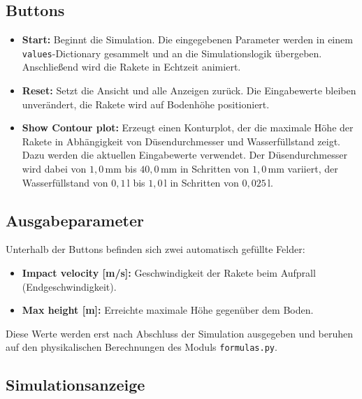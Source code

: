 \documentclass{SimSemBericht} %
\begin{document}
\subsection{Buttons}

\begin{itemize}
    \item \textbf{Start:}  
          Beginnt die Simulation. Die eingegebenen Parameter werden in
          einem \texttt{values}-Dictionary gesammelt und an die 
          Simulationslogik übergeben. Anschließend wird die Rakete in Echtzeit animiert.
          
    \item \textbf{Reset:}  
          Setzt die Ansicht und alle Anzeigen zurück. Die Eingabewerte
          bleiben unverändert, die Rakete wird auf Bodenhöhe positioniert.

    \item \textbf{Show Contour plot:}  
        Erzeugt einen Konturplot, der die maximale Höhe der Rakete
        in Abhängigkeit von Düsendurchmesser und Wasserfüllstand zeigt.
        Dazu werden die aktuellen Eingabewerte verwendet.
        Der Düsendurchmesser wird dabei von $1{,}0\,\mathrm{mm}$ bis $40{,}0\,\mathrm{mm}$ in Schritten von $1{,}0\,\mathrm{mm}$ variiert,
        der Wasserfüllstand von $0{,}1\,\mathrm{l}$ bis $1{,}0\,\mathrm{l}$ in Schritten von $0{,}025\,\mathrm{l}$.
\end{itemize}

\subsection{Ausgabeparameter}

Unterhalb der Buttons befinden sich zwei automatisch gefüllte Felder:

\begin{itemize}
    \item \textbf{Impact velocity [m/s]:}  
          Geschwindigkeit der Rakete beim Aufprall (Endgeschwindigkeit).

    \item \textbf{Max height [m]:}  
          Erreichte maximale Höhe gegenüber dem Boden.
\end{itemize}

Diese Werte werden erst nach Abschluss der Simulation ausgegeben und
beruhen auf den physikalischen Berechnungen des Moduls
\texttt{formulas.py}.

\subsection{Simulationsanzeige}
\end{document}
